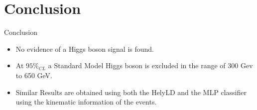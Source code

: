 \section{Conclusion}

\begin{frame}{Conclusion}
\begin{center}
\begin{itemize}
\item
  No evidence of a Higgs boson signal is found.
\item
  At $95\%_{CL}$ a Standard Model Higgs boson is excluded in the range of 300 Gev to 650 GeV.
\item
  Similar Results are obtained using both the HelyLD and the MLP classifier using the kinematic information of the events.
\end{itemize}


\end{center}
\end{frame}
